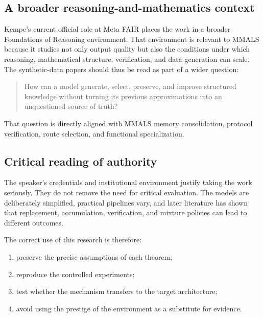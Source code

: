 \subsection{A broader reasoning-and-mathematics context}

Kempe's current official role at Meta FAIR places the work in a broader Foundations of Reasoning environment. That environment is relevant to MMALS because it studies not only output quality but also the conditions under which reasoning, mathematical structure, verification, and data generation can scale. The synthetic-data papers should thus be read as part of a wider question:

\begin{quote}
How can a model generate, select, preserve, and improve structured knowledge without turning its previous approximations into an unquestioned source of truth?
\end{quote}

That question is directly aligned with MMALS memory consolidation, protocol verification, route selection, and functional specialization.

\subsection{Critical reading of authority}

The speaker's credentials and institutional environment justify taking the work seriously. They do not remove the need for critical evaluation. The models are deliberately simplified, practical pipelines vary, and later literature has shown that replacement, accumulation, verification, and mixture policies can lead to different outcomes.

The correct use of this research is therefore:

\begin{enumerate}[leftmargin=*]
  \item preserve the precise assumptions of each theorem;
  \item reproduce the controlled experiments;
  \item test whether the mechanism transfers to the target architecture;
  \item avoid using the prestige of the environment as a substitute for evidence.
\end{enumerate}
